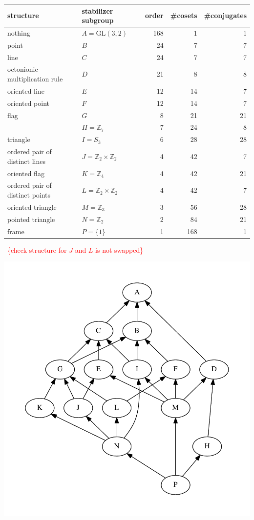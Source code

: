 \documentclass[11pt,oneside]{article}
\newcommand{\todo}[1]{\ \textcolor{red}{\{#1\}}\ }
\newcommand{\Integer}{\mathbb{Z}}
\newcommand{\GL}{\mathrm{GL}}
\begin{document}
\begin{samepage}
\begin{center}
\begin{tabular}{ |l|l|r|r|r| }
\hline
structure & stabilizer subgroup & order & \#cosets & \#conjugates \\
\hline
\hline
nothing & $A=\GL(3,2)$ &       168        &  1      &   1         \\
\hline
point   & $B$ &       24        &  7      &   7         \\
\hline
line & $C$ &       24        &  7      &   7         \\
\hline
octonionic multiplication rule & $D$ &       21        &  8      &   8         \\
\hline
oriented line & $E$ &       12        &  14      &   7         \\
\hline
oriented point & $F$ &       12        &  14      &   7         \\
\hline
flag & $G$ &       8        &  21      &   21         \\
\hline
        & $H=\Integer_7 $ &       7        &  24      &   8         \\
\hline
triangle & $I=S_3$ &       6        &  28      &   28         \\
\hline
ordered pair of distinct lines & $J=\Integer_2\times\Integer_2$ & 4 &  42 & 7 \\
\hline
oriented flag & $K=\Integer_4$ &       4        &  42      &   21         \\
\hline
ordered pair of distinct points & $L=\Integer_2\times\Integer_2$ &       4        &  42      &   7 \\
\hline
oriented triangle & $M=\Integer_3$ &       3        &  56      &   28         \\
\hline
pointed triangle & $N=\Integer_2$ &       2        &  84      &   21         \\
\hline
frame & $P=\{1\} $ &       1        &  168      &   1         \\
\hline
\end{tabular}
\end{center}
\end{samepage}

\todo{check structure for $J$ and $L$ is not swapped}

\begin{center}
\includegraphics[width=0.6\columnwidth]{subgroups_gl32.pdf} 
\end{center}
\end{document}
